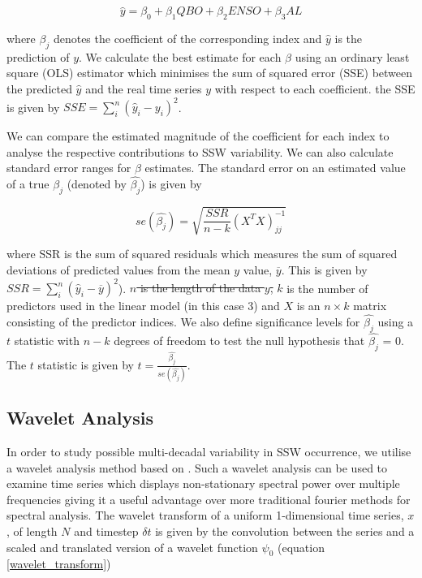 \documentclass[wcd, manuscript]{copernicus}
\providecommand{\DIFdel}[1]{{\protect\color{red}\sout{#1}}}                      %
\providecommand{\DIFdelbegin}{} %
\providecommand{\DIFdelend}{} %
\begin{document}
\begin{equation} \label{regression}
\hat{y} = \beta_0 + \beta_{1}QBO + \beta_{2}ENSO + \beta_{3}AL
\end{equation}

where $\beta_j$ denotes the coefficient of the corresponding index and $\hat{y}$ is the prediction of $y$. We calculate the best estimate for each $\beta$ using an ordinary least square (OLS) estimator which minimises the sum of squared error (SSE) between the predicted $\hat{y}$ and the real time series $y$ with respect to each coefficient. the SSE is given by $SSE = \sum_i^n{(\hat{y}_i - y_i)^2}$.

We can compare the estimated magnitude of the coefficient for each index to analyse the respective contributions to SSW variability. We can also calculate standard error ranges for $\beta$ estimates. The standard error on an estimated value of a true $\beta_j$ (denoted by $\hat{\beta_j}$) is given by 

\begin{equation} \label{regression}
se(\hat{\beta_j}) = \sqrt{\frac{SSR}{n - k} (X^TX)^{-1}_{jj}}
\end{equation}

where SSR is the sum of squared residuals which measures the sum of squared deviations of predicted values from the mean $y$ value, $\overline{y}$. This is given by $SSR = \sum_i^n{(\hat{y}_i - \overline{y})^2}$). \DIFdelbegin \DIFdel{$n$ is the length of the data $y$, }\DIFdelend $k$ is the number of predictors used in the linear model (in this case 3) and $X$ is an $n \times k$ matrix consisting of the predictor indices. We also define significance levels for $\hat{\beta_j}$ using a $t$ statistic with $n-k$ degrees of freedom to test the null hypothesis that $\hat{\beta_j}$ = 0. The $t$ statistic is given by $t = \frac{\hat{\beta_j}}{se(\hat{\beta_j})}$.

\subsection{Wavelet Analysis}
\label{wavelet_sec}
In order to study possible multi-decadal variability in SSW occurrence, we utilise a wavelet analysis method based on \cite{Torrence1998}. Such a wavelet analysis can be used to examine time series which displays non-stationary spectral power over multiple frequencies \citep{Daubechies} giving it a useful advantage over more traditional fourier methods for spectral analysis. The wavelet transform of a uniform 1-dimensional time series, $x$, of length $N$ and timestep $\delta t$ is given by the convolution between the series and a scaled and translated version of a wavelet function $\psi_0$ (equation \ref{wavelet_transform})
\end{document}
